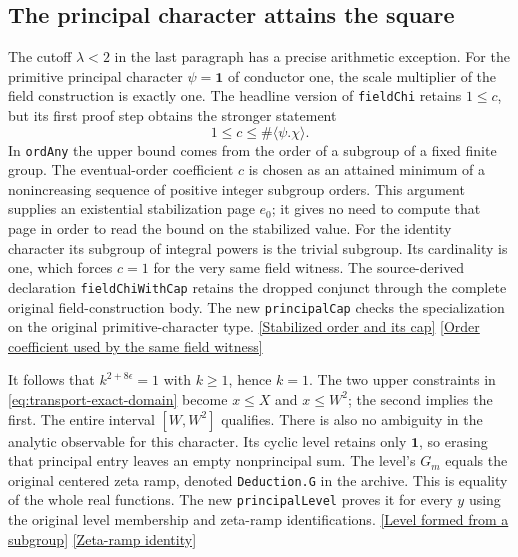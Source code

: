 \documentclass[12pt,letterpaper]{article}
\begin{document}
\subsection{The principal character attains the square}

The cutoff \(\lambda<2\) in the last paragraph has a precise arithmetic exception. For the primitive principal character \(\psi=\mathbf 1\) of conductor one, the scale multiplier of the field construction is exactly one. The headline version of \texttt{fieldChi} retains \(1\le c\), but its first proof step obtains the stronger statement
\[
                   1\le c\le \#\langle\psi.\chi\rangle .
\]
In \texttt{ordAny} the upper bound comes from the order of a subgroup of a fixed finite group. The eventual-order coefficient \(c\) is chosen as an attained minimum of a nonincreasing sequence of positive integer subgroup orders. This argument supplies an existential stabilization page \(e_0\); it gives no need to compute that page in order to read the bound on the stabilized value. For the identity character its subgroup of integral powers is the trivial subgroup. Its cardinality is one, which forces \(c=1\) for the very same field witness. The source-derived declaration \texttt{fieldChiWithCap} retains the dropped conjunct through the complete original field-construction body. The new \texttt{principalCap} checks the specialization on the original primitive-character type.
\href{https://github.com/nousentllc/riemann-hypothesis/blob/40e56bab026552e089d7afcfeff08d2defb9c005/src/Development/AutomorphicArithmetic/CharacterBoxes/OrdAny.lean#L86-L107}{[Stabilized order and its cap]}
\href{https://github.com/nousentllc/riemann-hypothesis/blob/40e56bab026552e089d7afcfeff08d2defb9c005/src/Development/AutomorphicArithmetic/CharacterBoxes/FieldChi.lean#L20-L30}{[Order coefficient used by the same field witness]}

It follows that \(k^{2+8\epsilon}=1\) with \(k\ge1\), hence \(k=1\). The two upper constraints in \eqref{eq:transport-exact-domain} become \(x\le X\) and \(x\le W^2\); the second implies the first. The entire interval \([W,W^2]\) qualifies. There is also no ambiguity in the analytic observable for this character. Its cyclic level retains only \(\mathbf 1\), so erasing that principal entry leaves an empty nonprincipal sum. The level's \(G_m\) equals the original centered zeta ramp, denoted \texttt{Deduction.G} in the archive. This is equality of the whole real functions. The new \texttt{principalLevel} proves it for every \(y\) using the original level membership and zeta-ramp identifications.
\href{https://github.com/nousentllc/riemann-hypothesis/blob/40e56bab026552e089d7afcfeff08d2defb9c005/src/Formalism/SharpRestriction/RamificationFrobenius/TotientGaloisClasses/ExplicitFormulaErrorOfHostConditions.lean#L102-L125}{[Level formed from a subgroup]}
\href{https://github.com/nousentllc/riemann-hypothesis/blob/40e56bab026552e089d7afcfeff08d2defb9c005/src/Development/AutomorphicArithmetic/PrimitiveCosets/GzEq.lean#L6-L12}{[Zeta-ramp identity]}
\end{document}
